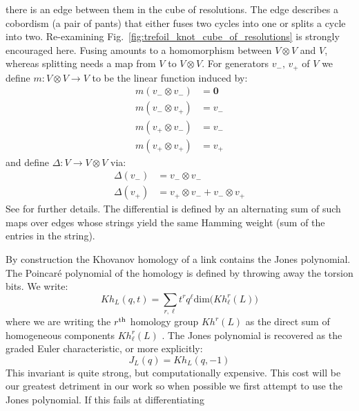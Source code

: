     there is an edge between them in the cube of resolutions.
    The edge describes a cobordism
    (a pair of pants) that either fuses two cycles into one or splits a cycle
    into two. Re-examining Fig.~\ref{fig:trefoil_knot_cube_of_resolutions} is
    strongly encouraged here. Fusing amounts to a homomorphism between
    $V\otimes{V}$ and $V$, whereas splitting needs a map from
    $V$ to $V\otimes{V}$. For generators $v_{-},\,v_{+}$ of $V$ we define
    $m:V\otimes{V}\rightarrow{V}$ to be the linear function induced by:
    \begin{align}
        m(v_{-}\otimes{v}_{-})&=\mathbf{0}\\
        m(v_{-}\otimes{v}_{+})&=v_{-}\\
        m(v_{+}\otimes{v}_{-})&=v_{-}\\
        m(v_{+}\otimes{v}_{+})&=v_{+}
    \end{align}
    and define $\Delta:V\rightarrow{V}\otimes{V}$ via:
    \begin{align}
            \Delta(v_{-})&=v_{-}\otimes{v}_{-}\\
            \Delta(v_{+})&=v_{+}\otimes{v}_{-}+v_{-}\otimes{v}_{+}
    \end{align}
    See \cite[p.~343]{BarNatanKhovanovJones} for further details. The
    differential is defined by an alternating sum of such maps over edges whose
    strings yield the same Hamming weight (sum of the entries in the string).
    \par\hfill\par
    By construction the Khovanov homology of a link contains the Jones
    polynomial. The Poincar\'{e} polynomial of the homology is defined by
    throwing away the torsion bits. We write:
    \begin{equation}
        \label{eqn:khovanov_polynomial}
        Kh_{L}(q,t)=
        \sum_{r,\ell}t^{r}q^{\ell}\textrm{dim}\big(Kh_{\ell}^{r}(L)\big)
    \end{equation}
    where we are writing the $r^{\small\textrm{th}}$ homology group
    $Kh^{r}(L)$ as the direct sum of homogeneous components
    $Kh_{\ell}^{r}(L)$ \cite{KatlasKhoHo}.
    The Jones polynomial is recovered as the graded Euler characteristic, or
    more explicitly:
    \begin{equation}
        J_{L}(q)=Kh_{L}(q,-1)
    \end{equation}
    This invariant is quite strong, but computationally expensive. This cost
    will be our greatest detriment in our work so when possible we first
    attempt to use the Jones polynomial. If this fails at differentiating
